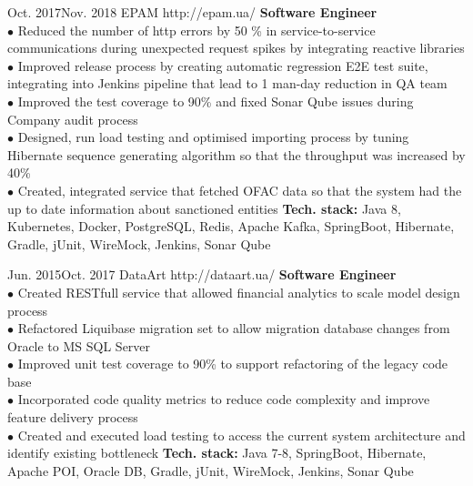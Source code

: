 \documentclass[10pt]{article} %
\begin{document}
\job
{Oct. 2017}{Nov. 2018}
{EPAM}
{http://epam.ua/}
{\textbf{Software Engineer}}
{
\textbf{}    
\\$\bullet$ Reduced the number of http errors by 50 \% in service-to-service communications during unexpected request spikes by integrating reactive libraries 
\\$\bullet$ Improved release process by creating automatic regression E2E test suite, integrating into Jenkins pipeline that lead to 1 man-day reduction in QA team 
\\$\bullet$ Improved the test coverage to 90\% and fixed Sonar Qube issues during Company audit process
\\$\bullet$ Designed, run load testing and optimised importing process by tuning Hibernate sequence generating algorithm so that the throughput was increased by 40\%
\\$\bullet$ Created, integrated service that fetched OFAC data so that the system had the up to date information about sanctioned entities
\vadjust{\vspace{4pt}}
\newline
\textbf{Tech. stack: }{Java 8, Kubernetes, Docker, PostgreSQL, Redis, Apache Kafka, SpringBoot, Hibernate, Gradle, jUnit, WireMock, Jenkins, Sonar Qube}  
 }

\job
{Jun. 2015}{Oct. 2017}
{DataArt}
{http://dataart.ua/}
{\textbf{Software Engineer}}
{
\textbf{}  
\\$\bullet$ Created RESTfull service that allowed financial analytics to scale model design process 
\\$\bullet$ Refactored Liquibase migration set to allow migration database changes from Oracle to MS SQL Server
\\$\bullet$ Improved unit test coverage to 90\% to support refactoring of the legacy code base
\\$\bullet$ Incorporated code quality metrics to reduce code complexity and improve feature delivery process
\\$\bullet$ Created and executed load testing to access the current system architecture and identify existing bottleneck 
\vadjust{\vspace{4pt}}
\newline
\textbf{Tech. stack: }{Java 7-8, SpringBoot, Hibernate, Apache POI, Oracle DB, Gradle, jUnit, WireMock, Jenkins, Sonar Qube}  
 }
\end{document}
